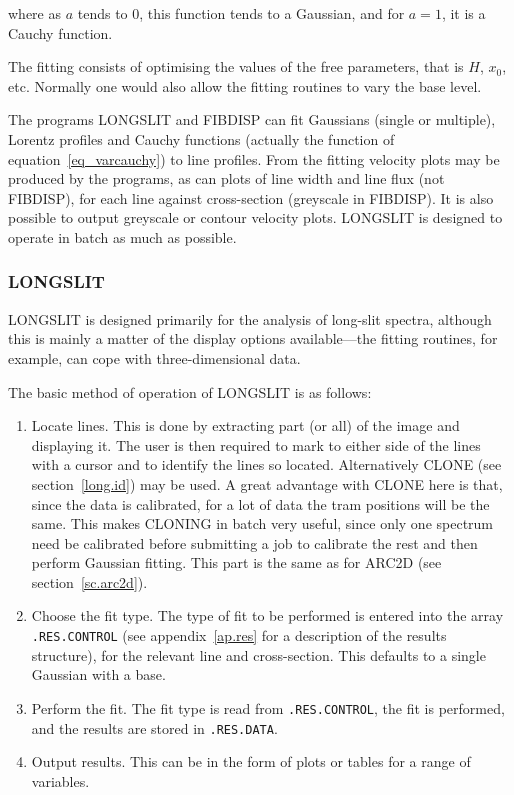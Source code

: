 where as $a$ tends to 0, this function tends to a Gaussian, and for
$a=1$, it is a Cauchy function.

The fitting consists of optimising the values of the free parameters,
that is $H$, $x_{0}$, etc.  Normally one would also allow the fitting
routines to vary the base level.

The programs LONGSLIT and FIBDISP can fit Gaussians (single or
multiple), Lorentz profiles and Cauchy functions (actually the function
of equation~\ref{eq_varcauchy}) to line profiles. From the fitting
velocity plots may be produced by the programs, as can plots of line
width and line flux (not FIBDISP), for each line against cross-section
(greyscale in FIBDISP).  It is also possible to output greyscale or
contour velocity plots.  LONGSLIT is designed to operate in batch as
much as possible.

\subsubsection{LONGSLIT}
\label{sec.long}

LONGSLIT is designed primarily for the analysis of long-slit spectra,
although this is mainly a matter of the display options available---the
fitting routines, for example, can cope with three-dimensional data.

The basic method of operation of LONGSLIT is as follows:

\begin{enumerate}

\item Locate lines.  This is done by extracting part (or all) of the
image and displaying it.  The user is then required to mark to either
side of the lines with a cursor and to identify the lines so located.
Alternatively CLONE (see section~\ref{long.id}) may be used.  A great
advantage with CLONE here is that, since the data is calibrated, for a
lot of data the tram positions will be the same.  This makes CLONING in
batch very useful, since only one spectrum need be calibrated before
submitting a job to calibrate the rest and then perform Gaussian
fitting.  This part is the same as for ARC2D (see
section~\ref{sc.arc2d}).

\item Choose the fit type.  The type of fit to be performed is entered
into the array {\tt{.RES.CONTROL}} (see appendix~\ref{ap.res} for a
description of the results structure), for the relevant line and
cross-section.  This defaults to a single Gaussian with a base.

\item Perform the fit.  The fit type is read from {\tt{.RES.CONTROL}}, the fit
is performed, and the results are stored in {\tt{.RES.DATA}}.

\item Output results.  This can be in the form of plots or tables for a
range of variables.

\end{enumerate}

